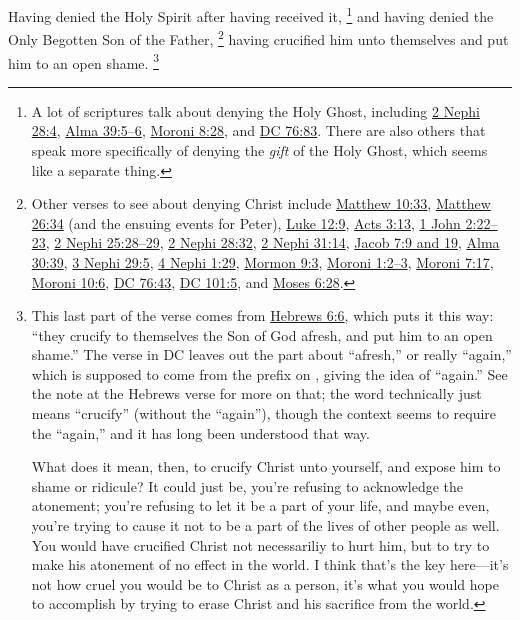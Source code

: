 		Having denied the Holy Spirit after having received it,%
			\footnote{%
				A lot of scriptures talk about denying the Holy Ghost, including \hyperref[2NEPHI-28-4]{2 Nephi 28:4}, \hyperref[ALMA-39-5]{Alma 39:5--6}, \hyperref[MORONI-8-28]{Moroni 8:28}, and \hyperref[DC76-83]{DC 76:83}. There are also others that speak more specifically of denying the \textit{gift} of the Holy Ghost, which seems like a separate thing.
				}
		and having denied the Only Begotten Son of the Father,%
			\footnote{%
				Other verses to see about denying Christ include \hyperref[MATTHEW-10-33]{Matthew 10:33}, \hyperref[MATTHEW-26-34]{Matthew 26:34} (and the ensuing events for Peter), \hyperref[LUKE-12-9]{Luke 12:9}, \hyperref[ACTS-3-13]{Acts 3:13}, \hyperref[1JOHN-2-22]{1 John 2:22--23}, \hyperref[2NEPHI-25-28]{2 Nephi 25:28--29}, \hyperref[2NEPHI-28-32]{2 Nephi 28:32}, \hyperref[2NEPHI-31-14]{2 Nephi 31:14}, \hyperref[JACOB-7-9]{Jacob 7:9 and 19}, \hyperref[ALMA-30-39]{Alma 30:39}, \hyperref[3NEPHI-29-5]{3 Nephi 29:5}, \hyperref[4NEPHI-1-29]{4 Nephi 1:29}, \hyperref[MORMON-9-3]{Mormon 9:3}, \hyperref[MORONI-1-2]{Moroni 1:2--3}, \hyperref[MORONI-7-17]{Moroni 7:17}, \hyperref[MORONI-10-6]{Moroni 10:6}, \hyperref[DC76-43]{DC 76:43}, \hyperref[DC101-5]{DC 101:5}, and \hyperref[MOSES-6-28]{Moses 6:28}.
				}
		having crucified him unto themselves and put him to an open shame.%
			\footnote{%
				This last part of the verse comes from \hyperref[HEBREWS-6-6]{Hebrews 6:6}, which puts it this way: ``they crucify to themselves the Son of God afresh, and put him to an open shame.'' The verse in DC leaves out the part about ``afresh,'' or really ``again,'' which is supposed to come from the prefix on , giving the idea of ``again.'' See the note at the Hebrews verse for more on that; the word technically just means ``crucify'' (without the ``again''), though the context seems to require the ``again,'' and it has long been understood that way.
				
				What does it mean, then, to crucify Christ unto yourself, and expose him to shame or ridicule? It could just be, you're refusing to acknowledge the atonement; you're refusing to let it be a part of your life, and maybe even, you're trying to cause it not to be a part of the lives of other people as well. You would have crucified Christ not necessariliy to hurt him, but to try to make his atonement of no effect in the world. I think that's the key here---it's not how cruel you would be to Christ as a person, it's what you would hope to accomplish by trying to erase Christ and his sacrifice from the world.
				}

